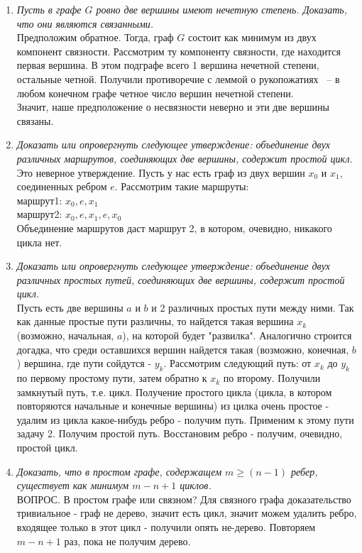 \documentclass[10pt,a4paper]{article}
\begin{document}
\begin{enumerate}
	\item \textit{Пусть в графе $G$ ровно две вершины имеют нечетную степень. Доказать, что они являются связанными.}\\
	Предположим обратное. Тогда, граф $G$ состоит как минимум из двух компонент связности. Рассмотрим ту компоненту связности, где находится первая вершина. В этом подграфе всего 1 вершина нечетной степени, остальные четной. Получили противоречие с леммой о рукопожатиях ~-- в любом конечном графе четное число вершин нечетной степени.\\
	  Значит, наше предположение о несвязности неверно и эти две вершины связаны.
	\item \textit{Доказать или опровергнуть следующее утверждение: объединение двух различных маршрутов, соединяющих две вершины, содержит простой цикл.}\\
	Это неверное утверждение. Пусть у нас есть граф из двух вершин $x_0$ и $x_1$, соединенных ребром $e$. Рассмотрим такие маршруты:\\
	маршрут1: $x_0,e,x_1$\\
	маршрут2: $x_0,e,x_1,e,x_0$\\
 	Объединение маршрутов даст маршрут 2, в котором, очевидно, никакого цикла нет.
	\item \textit{Доказать или опровергнуть следующее утверждение: объединение двух различных простых путей, соединяющих две вершины, содержит простой цикл.}\\
	Пусть есть две вершины $a$ и $b$ и 2 различных простых пути между ними.
	Так как данные простые пути различны, то найдется такая вершина $x_k$ (возможно, начальная, $a$), на которой будет "развилка". Аналогично строится догадка, что среди оставшихся вершин найдется такая (возможно, конечная, $b$) вершина, где пути сойдутся - $y_k$. Рассмотрим следующий путь: от $x_k$ до $y_k$ по первому простому пути, затем обратно к $x_k$ по второму. Получили замкнутый путь, т.е. цикл. Получение простого цикла (цикла, в котором повторяются начальные и конечные вершины) из цилка очень простое - удалим из цикла какое-нибудь ребро - получим путь. Применим к этому пути задачу 2. Получим простой путь. Восстановим ребро - получим, очевидно, простой цикл.
	\item \textit{Доказать, что в простом графе, содержащем $m\geqslant(n-1)$ ребер, существует как минимум $m-n+1$ циклов.}\\
	ВОПРОС. В простом графе или связном? Для связного графа доказательство тривиальное - граф не дерево, значит есть цикл, значит можем удалить ребро, входящее только в этот цикл - получили опять не-дерево. Повторяем $m-n+1$ раз, пока не получим дерево.

\end{enumerate}
\end{document}
